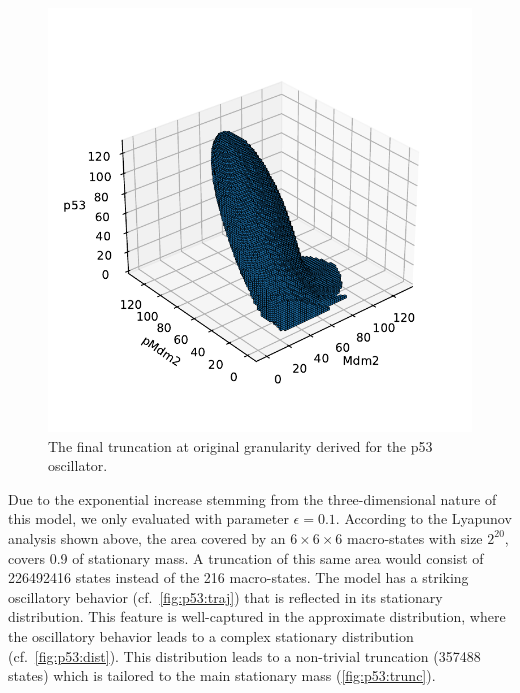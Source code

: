 \begin{figure}[htb]
    \centering
    \begin{minipage}{0.9\textwidth}
    \centering
    \includegraphics[width=\textwidth]{gfx/trunc_p53.pdf}
    \end{minipage}
\caption{The final truncation at original granularity derived for the p53 oscillator.}
\label{fig:p53:trunc}
\end{figure}
Due to the exponential increase stemming from the three-di\-men\-sion\-al nature of this model, we only evaluated with parameter $\epsilon=0.1$.
According to the Lyapunov analysis shown above, the area covered by an $6\times 6\times 6$ macro-states with size $2^{20}$, covers \num{0.9} of stationary mass.
A truncation of this same area would consist of \num{226492416} states instead of the \num{216} macro-states.
The model has a striking oscillatory behavior (cf.\ \autoref{fig:p53:traj}) that is reflected in its stationary distribution.
This feature is well-captured in the approximate distribution, where the oscillatory behavior leads to a complex stationary distribution (cf.\ \autoref{fig:p53:dist}).
This distribution leads to a non-trivial truncation (\num{357488} states) which is tailored to the main stationary mass (\autoref{fig:p53:trunc}).
